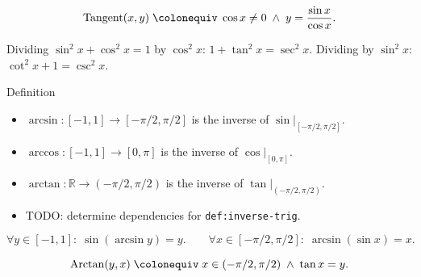 \begin{remark*}
\[
  \operatorname{Tangent}(x,y)
  \;\colonequiv\;
  \cos x \neq 0 \;\wedge\; y = \frac{\sin x}{\cos x}.
\]
\end{remark*}

\begin{remark*}
Dividing $\sin^2 x + \cos^2 x = 1$ by $\cos^2 x$:
$1 + \tan^2 x = \sec^2 x$.
Dividing by $\sin^2 x$: $\cot^2 x + 1 = \csc^2 x$.
\end{remark*}


\begin{definitionbox}{Definition}
\begin{definition}
\label{def:inverse-trig}
\begin{itemize}
  \item $\arcsin : [-1,1] \to [-\pi/2, \pi/2]$ is the inverse of
    $\sin\big|_{[-\pi/2,\pi/2]}$.
  \item $\arccos : [-1,1] \to [0,\pi]$ is the inverse of
    $\cos\big|_{[0,\pi]}$.
  \item $\arctan : \mathbb{R} \to (-\pi/2, \pi/2)$ is the inverse
    of $\tan\big|_{(-\pi/2,\pi/2)}$.
\end{itemize}
\end{definition}
\end{definitionbox}

\begin{dependencies}
\begin{itemize}
  \item TODO: determine dependencies for \texttt{def:inverse-trig}.
\end{itemize}
\end{dependencies}

\begin{remark*}
\[
  \forall y\in[-1,1]:\;\sin(\arcsin y)=y.
  \qquad
  \forall x\in[-\pi/2,\pi/2]:\;\arcsin(\sin x)=x.
\]
\end{remark*}

\begin{remark*}
\[
  \operatorname{Arctan}(y,x)
  \;\colonequiv\;
  x\in(-\pi/2,\pi/2) \;\wedge\; \tan x = y.
\]
\end{remark*}

